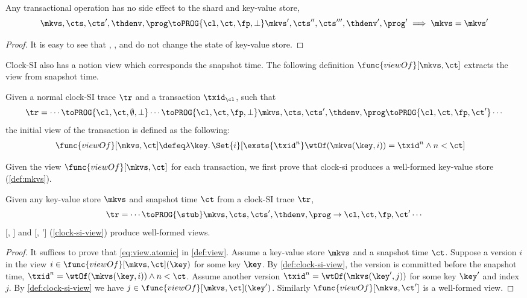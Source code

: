 \begin{lemma}
    \label{lem:commit-after-snapshot-time}
    Any transactional operation has no side effect to the shard and key-value store,
    \[
        \mkvs, \cts, \cts', \thdenv, \prog \toPROG{\cl, \ct, \fp, \perp} \mkvs', \cts'', \cts''', \thdenv', \prog' \implies \mkvs = \mkvs'
    \]
\end{lemma}
\begin{proof}
    It is easy to see that 
    , ,  and  do not change the state of key-value store.
\end{proof}

Clock-SI also has a notion view which corresponds the snapshot time.
The following definition \( \func{viewOf}[\mkvs,\ct] \) extracts the view from snapshot time.
\begin{definition}
    \label{clock-si-view}
    \label{def:clock-si-view}
    Given a normal clock-SI trace \( \tr \) and a transaction \( \txid_\cl \), such that
    \[
        \tr = \cdots \toPROG{\cl, \ct, \emptyset, \perp} \cdots \toPROG{\cl, \ct, \fp, \perp} \mkvs, \cts, \cts', \thdenv, \prog  \toPROG{\cl, \ct, \fp, \ct'} \cdots
    \] 
    the initial view of the transaction is defined as the following:
    \begin{align*}
        \func{viewOf}[\mkvs,\ct] & \defeq \lambda \key \ldotp \Set{i}[\exsts{\txid^{n} } \wtOf(\mkvs(\key,i)) = \txid^{n} \land n < \ct]
    \end{align*}
\end{definition}

Given the view \( \func{viewOf}[\mkvs,\ct] \) for each transaction, 
we first prove that clock-si produces a well-formed key-value store (\cref{def:mkvs}).
\begin{lemma}
    \label{lem:well-formed-clock-si-view}
    Given any key-value store \( \mkvs \) and snapshot time \( \ct \) from a clock-SI trace \( \tr \),
    \[
        \tr = \cdots \toPROG{\stub} \mkvs, \cts, \cts', \thdenv, \prog \to{\cl, \ct, \fp, \ct'} \cdots
    \]
    [\mkvs, \ct] and [\mkvs, \ct'] (\cref{clock-si-view}) produce well-formed views.
\end{lemma}
\begin{proof}                     
    It suffices to prove that \cref{eq:view.atomic} in \cref{def:view}.
    Assume a key-value store \( \mkvs \) and a snapshot time \( \ct \).
    Suppose a version \( i \) in the view \( i \in \func{viewOf}[\mkvs,\ct](\key)\) for some key \( \key \).
    By \cref{def:clock-si-view}, the version is committed before the snapshot time,
    \ie \( \txid^n = \wtOf(\mkvs(\key, i)) \land n < \ct\).
    Assume another version \( \txid^n = \wtOf(\mkvs(\key', j)) \) for some key \( \key' \) and index \( j \).
    By \cref{def:clock-si-view} we have \( j \in \func{viewOf}[\mkvs,\ct](\key') \).
    Similarly \( \func{viewOf}[\mkvs, \ct'] \) is a well-formed view.
\end{proof}

